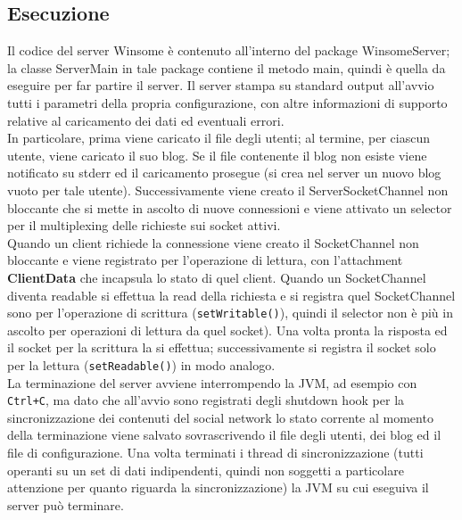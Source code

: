 \subsection{Esecuzione}
Il codice del server Winsome è contenuto all'interno del package WinsomeServer; la classe ServerMain in tale package contiene il metodo main, quindi è quella da eseguire per far partire il server. Il server stampa su standard output all'avvio tutti i parametri della propria configurazione, con altre informazioni di supporto relative al caricamento
dei dati ed eventuali errori.\\
In particolare, prima viene caricato il file degli utenti; al termine, per ciascun utente, viene caricato il suo blog. Se il file contenente il blog 
non esiste viene notificato su stderr ed il caricamento prosegue (si crea nel server un nuovo blog vuoto per tale utente). Successivamente viene creato il ServerSocketChannel
non bloccante che si mette in ascolto di nuove connessioni e viene attivato un selector per il multiplexing delle richieste sui socket attivi.\\
Quando un client richiede la connessione viene creato il SocketChannel non bloccante e viene registrato per l'operazione di lettura, con l'attachment \textbf{ClientData} che incapsula lo stato di quel client. Quando un SocketChannel diventa readable si effettua la read della richiesta e si registra quel SocketChannel sono per l'operazione di scrittura (\verb|setWritable()|), quindi il selector non è più in
ascolto per operazioni di lettura da quel socket). Una volta pronta la risposta ed il socket per la scrittura la si effettua; successivamente si registra il socket solo per la lettura (\verb|setReadable()|) in modo analogo.\\
La terminazione del server avviene interrompendo la JVM, ad esempio con \verb|Ctrl+C|, ma  dato che all'avvio sono registrati degli shutdown hook per la sincronizzazione dei contenuti del social network lo stato corrente al momento della terminazione viene salvato sovrascrivendo il file degli utenti, dei blog ed il file di configurazione. Una volta terminati i thread di sincronizzazione (tutti operanti su un set di dati indipendenti, quindi non soggetti a particolare attenzione per quanto riguarda la sincronizzazione) la JVM su cui eseguiva il server può terminare.
